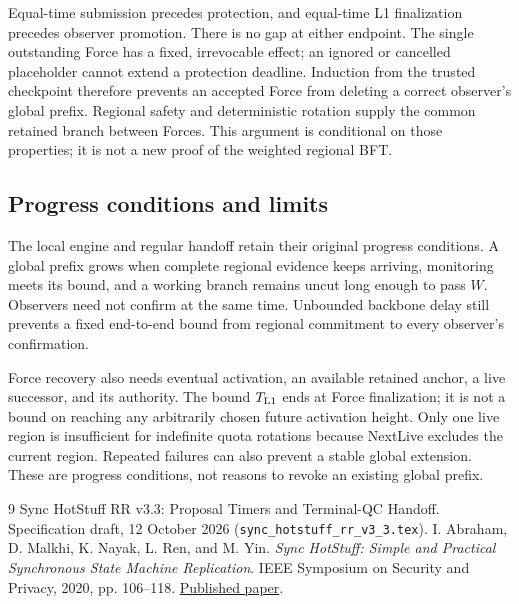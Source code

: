 \documentclass[11pt,a4paper]{article}
\begin{document}
Equal-time submission precedes protection, and equal-time L1
finalization precedes observer promotion. There is no gap at either
endpoint. The single outstanding Force has a fixed, irrevocable effect;
an ignored or cancelled placeholder cannot extend a protection deadline.
Induction from the trusted checkpoint therefore prevents an accepted
Force from deleting a correct observer's global prefix. Regional safety
and deterministic rotation supply the common retained branch between
Forces. This argument is conditional on those properties; it is not a
new proof of the weighted regional BFT.

\subsection{Progress conditions and limits}
The local engine and regular handoff retain their original progress
conditions. A global prefix grows when complete regional evidence keeps
arriving, monitoring meets its bound, and a working branch remains
uncut long enough to pass $W$. Observers need not confirm at the same
time. Unbounded backbone delay still prevents a fixed end-to-end bound
from regional commitment to every observer's confirmation.

Force recovery also needs eventual activation, an available retained
anchor, a live successor, and its authority. The bound $T_{\rm L1}$ ends
at Force finalization; it is not a bound on reaching any arbitrarily
chosen future activation height. Only one live region is insufficient
for indefinite quota rotations because NextLive excludes the current
region. Repeated failures can also prevent a stable global extension.
These are progress conditions, not reasons to revoke an existing global
prefix.

\begingroup\small
\begin{thebibliography}{9}
Sync HotStuff RR v3.3: Proposal Timers and Terminal-QC Handoff.
Specification draft, 12 October 2026
(\texttt{sync\_hotstuff\_rr\_v3\_3.tex}).
I. Abraham, D. Malkhi, K. Nayak, L. Ren, and M. Yin.
\emph{Sync HotStuff: Simple and Practical Synchronous State Machine Replication}.
IEEE Symposium on Security and Privacy, 2020, pp. 106--118.
\href{https://conferences.computer.org/sp/pdfs/sp/2020/349700a106.pdf}{Published paper}.
\end{thebibliography}
\endgroup
\end{document}
